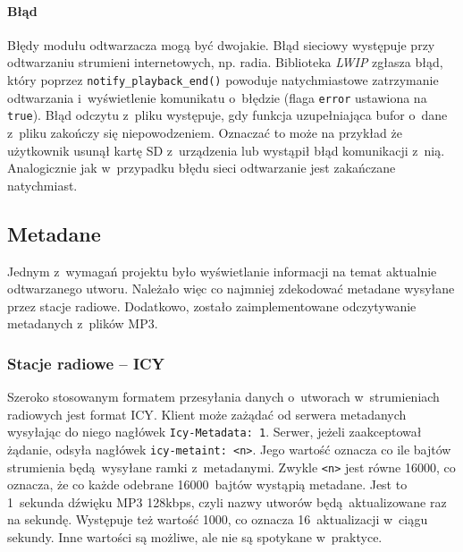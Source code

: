 \documentclass[polish]{aghengthesis}
\begin{document}
			\paragraph{Błąd}
				Błędy modułu odtwarzacza mogą być dwojakie. Błąd sieciowy występuje przy odtwarzaniu strumieni internetowych, np. radia. Biblioteka \textit{LWIP} zgłasza błąd, który poprzez \lstinline|notify_playback_end()| powoduje natychmiastowe zatrzymanie odtwarzania i~wyświetlenie komunikatu o~błędzie (flaga \lstinline|error| ustawiona na \lstinline|true|). Błąd odczytu z~pliku występuje, gdy funkcja uzupełniająca bufor o~dane z~pliku zakończy się niepowodzeniem. Oznaczać to może na przykład że użytkownik usunął kartę SD z~urządzenia lub wystąpił błąd komunikacji z~nią. Analogicznie jak w~przypadku błędu sieci odtwarzanie jest zakańczane natychmiast.
			
		\subsection{Metadane}
		Jednym z~wymagań projektu było wyświetlanie informacji na temat aktualnie odtwarzanego utworu. Należało więc co najmniej zdekodować metadane wysyłane przez stacje radiowe. Dodatkowo, zostało zaimplementowane odczytywanie metadanych z~plików MP3.
		
		\subsubsection{Stacje radiowe -- ICY}
			Szeroko stosowanym formatem przesyłania danych o~utworach w~strumieniach radiowych jest format ICY\textsuperscript{\cite{icy_spec}}. Klient może zażądać od serwera metadanych wysyłając do niego nagłówek \lstinline|Icy-Metadata: 1|. Serwer, jeżeli zaakceptował żądanie, odsyła nagłówek \lstinline|icy-metaint: <n>|. Jego wartość oznacza co ile bajtów strumienia będą wysyłane ramki z~metadanymi. Zwykle \lstinline|<n>| jest równe 16000, co oznacza, że co każde odebrane 16000~bajtów wystąpią metadane. Jest to 1~sekunda dźwięku MP3 128kbps, czyli nazwy utworów będą aktualizowane raz na sekundę. Występuje też wartość 1000, co oznacza 16~aktualizacji w~ciągu sekundy. Inne wartości są możliwe, ale nie są spotykane w~praktyce.
			$ $\\
			
\end{document}
